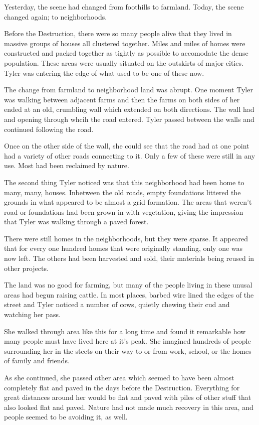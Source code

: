 \documentclass[courier]{sffms}
\begin{document}
Yesterday, the scene had changed from foothills to farmland.
Today, the scene changed again; to neighborhoods.

Before the Destruction, there were so many people alive
that they lived in massive groups of houses all clustered
together. Miles and miles of homes were constructed and
packed together as tightly as possible to accomodate the
dense population. These areas were usually situated on the
outskirts of major cities. Tyler was entering the edge of what
used to be one of these now.

The change from farmland to neighborhood land was abrupt.
One moment Tyler was walking between adjacent farms
and then the farms on both sides of her ended at an old,
crumbling wall which extended on both directions. The wall
had and opening through whcih the road entered. Tyler passed
between the walls and continued following the road.

Once on the other side of the wall, she could see that the
road had at one point had a variety of other roads connecting
to it. Only a few of these were still in any use. Most had been
reclaimed by nature.

The second thing Tyler noticed was that this neighborhood had
been home to many, many, houses. Inbetween the old roads,
empty foundations littered the grounds in what appeared to be
almost a grid formation. The areas that weren't road or foundations
had been grown in with vegetation, giving the impression that
Tyler was walking through a paved forest.

There were still homes in the neighborhoods, but they were
sparse. It appeared that for every one hundred homes that
were originally standing, only one was now left. The others
had been harvested and sold, their materials being reused in
other projects.

The land was no good for farming, but many of the people
living in these unusal areas had begun raising cattle. In most
places, barbed wire lined the edges of the street and Tyler
noticed a number of cows, quietly chewing their cud and 
watching her pass. 

She walked through area like this for a long time and
found it remarkable how many people must have lived
here at it's peak. She imagined hundreds of people
surrounding her in the steets on their way to or from
work, school, or the homes of family and friends.

As she continued, she passed other area which seemed
to have been almost completely flat and paved in the days
before the Destruction. Everything for great distances
around her would be flat and paved with piles of other
stuff that also looked flat and paved. Nature had not made
much recovery in this area, and people seemed to be
avoiding it, as well.
\end{document}
